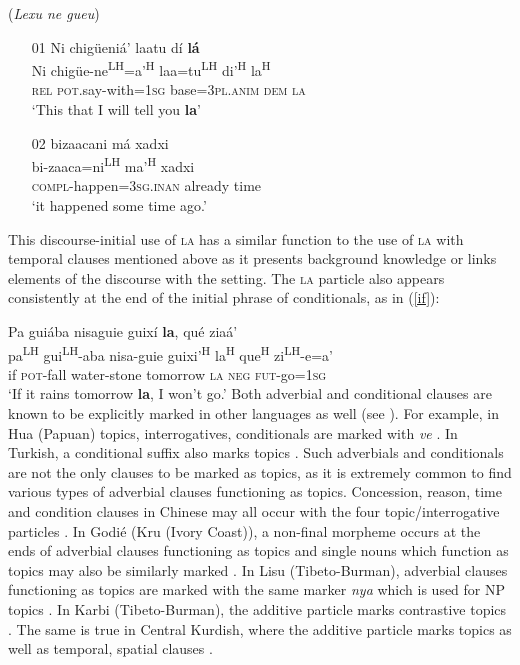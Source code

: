 \ea\label{initial2} (\textit{Lexu ne gueu})
\begin{itemize}
\item[01]
\glll Ni chig\"{u}eni\'{a}' laatu d\'{i} \textbf{l\'{a}}  \\
Ni chig\"{u}e-ne\textsuperscript{LH}=a'\textsuperscript{H} laa=tu\textsuperscript{LH} di'\textsuperscript{H}  la\textsuperscript{H}  \\
\textsc{rel} \textsc{pot}.say-with=1\textsc{sg} base=3\textsc{pl.anim} \textsc{dem} \textsc{la}  \\
\glt  `This that I will tell you \textbf{la}'


\item[02]
\glll bizaacani m\'{a} xadxi  \\
bi-zaaca=ni\textsuperscript{LH} ma'\textsuperscript{H} xadxi  \\
\textsc{compl}-happen=3\textsc{sg.inan} already time  \\
\glt  `it happened some time ago.'

\end{itemize}
\z
This discourse-initial use of \textsc{la} has a similar function to the use of \textsc{la} with temporal clauses mentioned above as it presents background knowledge or links elements of the discourse with the setting. The \textsc{la} particle also appears consistently at the end of the initial phrase of conditionals, as in (\ref{if}):

\ea\label{if}
\glll Pa gui\'{a}ba nisaguie guix\'{i} \textbf{la}, qu\'{e} zia\'{a}'  \\
pa\textsuperscript{LH} gui\textsuperscript{LH}-aba nisa-guie guixi'\textsuperscript{H}  la\textsuperscript{H} que\textsuperscript{H} zi\textsuperscript{LH}-e=a'  \\
if \textsc{pot}-fall water-stone tomorrow \textsc{la} \textsc{neg} \textsc{fut}-go=1\textsc{sg}  \\
\glt `If it rains tomorrow \textbf{la}, I won't go.' \hfill \citep[109]{pickett1998}
\z
Both adverbial and conditional clauses are known to be explicitly marked in other languages as well (see \citet[292]{thompson2007}). For example, in Hua (Papuan) topics, interrogatives, conditionals are marked with \textit{ve} \citep{haiman1978}. In Turkish, a conditional suffix also marks topics \citep{kerslake1996}. Such adverbials and conditionals are not the only clauses to be marked as topics, as it is extremely common to find various types of adverbial clauses functioning as topics. Concession, reason, time and condition clauses in Chinese may all occur with the four topic/interrogative particles \citep[293]{thompson2007}. In Godi\'{e} (Kru (Ivory Coast)), a non-final morpheme occurs at the ends of adverbial clauses functioning as topics and single nouns which function as topics may also be similarly marked \citep{marchese1977,marchese1987}. In Lisu (Tibeto-Burman), adverbial clauses functioning as topics are marked with the same marker \textit{nya} which is used for NP topics \citep[294]{thompson2007}. In Karbi (Tibeto-Burman), the additive particle marks contrastive topics \citep{konnerth2013}. The same is true in Central Kurdish, where the additive particle marks topics as well as temporal, spatial clauses \citep{opengin2013}.


